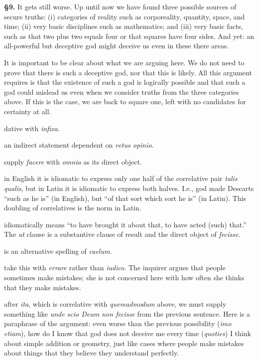 \prenotes

\textbf{§9.} It gets still worse. Up until now we have found three possible sources of secure truths: (i) categories of reality such as corporeality, quantity, space, and time; (ii) very basic disciplines such as mathematics; and (iii) very basic facts, such as that two plus two equals four or that squares have four sides. And yet: an all-powerful but deceptive god might deceive us even in these there areas.

It is important to be clear about what we are arguing here. We do not need to prove that there is such a deceptive god, nor that this is likely. All this argument requires is that the existence of such a god is logically possible and that such a god could mislead us even when we consider truths from the three categories above. If this is the case, we are back to square one, left with no candidates for certainty at all.

 dative with \textit{infixa}.

 an indirect statement dependent on \textit{vetus opinio}.

 supply \textit{facere} with \textit{omnia} as its direct object.

 in English it is idiomatic to express only one half of the correlative pair \textit{talis qualis}, but in Latin it is idiomatic to express both halves. I.e., god made Descarts ``such as he is'' (in English), but ``of that sort which sort he is'' (in Latin). This doubling of correlatives is the norm in Latin.

 idiomatically means ``to have brought it about that, to have acted (such) that.'' The \textit{ut} clause is a substantive clause of result and the direct object of \textit{fecisse}.

 is an alternative spelling of \textit{caelum}.

 take this with \textit{errare} rather than \textit{iudico}. The inquirer argues that people sometimes make mistakes; she is not concerned here with how often she thinks that they make mistakes.

 after \textit{ita}, which is correlative with \textit{quemadmodum} above, we must supply something like \textit{unde scio Deum non fecisse} from the previous sentence. Here is a paraphrase of the argument: even worse than the previous possibility (\textit{imo etiam}), how do I know that god does not deceive me every time (\textit{quoties}) I think about simple addition or geometry, just like cases where people make mistakes about things that they believe they understand perfectly.

